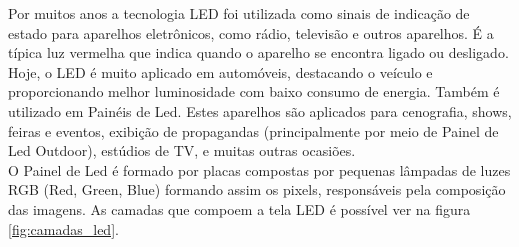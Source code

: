 Por muitos anos a tecnologia LED foi utilizada como sinais de indicação de estado para aparelhos eletrônicos, como rádio, televisão e outros aparelhos. É a típica luz vermelha que indica quando o aparelho se encontra ligado ou desligado. Hoje, o LED é muito aplicado em automóveis, destacando o veículo e proporcionando melhor luminosidade com baixo consumo de energia. Também é utilizado em Painéis de Led. Estes aparelhos são aplicados para cenografia, shows, feiras e eventos, exibição de propagandas (principalmente por meio de Painel de Led Outdoor), estúdios de TV, e muitas outras ocasiões.\\

O Painel de Led é formado por placas compostas por pequenas lâmpadas de luzes RGB (Red, Green, Blue) formando assim os pixels, responsáveis pela composição das imagens. As camadas que compoem a tela LED é possível ver na figura \ref{fig:camadas_led}.\\




















